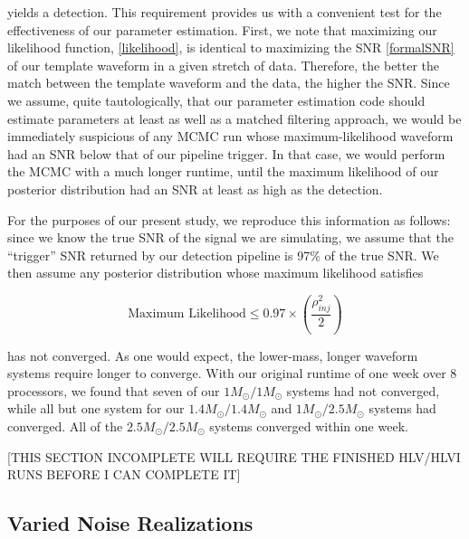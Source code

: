 \documentclass[11pt,a4paper]{emulateapj}
\newcommand{\carl}[1]{{\color{red}  #1}}
\begin{document}
\noindent  yields a detection.  This requirement provides us with a convenient test for the effectiveness 
of our parameter estimation.  First, we note that maximizing our likelihood function, \eqref{likelihood},
is identical to maximizing the SNR \eqref{formalSNR} of our template waveform in a given stretch of data.
Therefore, the better the match between the template waveform and the data, the higher the SNR.  Since we
assume, quite tautologically, that our parameter estimation code should estimate parameters at least as 
well as a matched filtering approach, we would be immediately suspicious of any MCMC run whose 
maximum-likelihood waveform had an SNR below that of our pipeline trigger.   In that case, we would perform
the MCMC with a much longer runtime, until the maximum likelihood of our posterior distribution had an SNR
at least as high as the detection.

For the purposes of our present study, we reproduce this information as follows: since we know the true SNR
of the signal we are simulating, we assume that the ``trigger'' SNR returned by our detection pipeline is 
97\% of the true SNR.  We then assume any posterior distribution whose maximum likelihood satisfies

\begin{equation}
\text{Maximum Likelihood} \leq 0.97 \times \left(\frac{\rho_{inj}^2}{2}\right) 
\nonumber
\end{equation}

\noindent has not converged.  As one would expect, the lower-mass, longer waveform systems require longer 
to converge.  With our original runtime of one week over 8 processors, we found that seven of our 
$1M_{\odot}/1M_{\odot}$ systems had not converged, while all but one system for our $1.4M_{\odot}/1.4M_{\odot}$
and $1M_{\odot}/2.5M_{\odot}$ systems had converged.  All of the $2.5M_{\odot}/2.5M_{\odot}$ systems 
converged within one week.  

\carl{[THIS SECTION INCOMPLETE  WILL REQUIRE THE FINISHED HLV/HLVI RUNS BEFORE I CAN COMPLETE IT]}


\subsection{Varied Noise Realizations}
\label{noiseSection}
\end{document}
